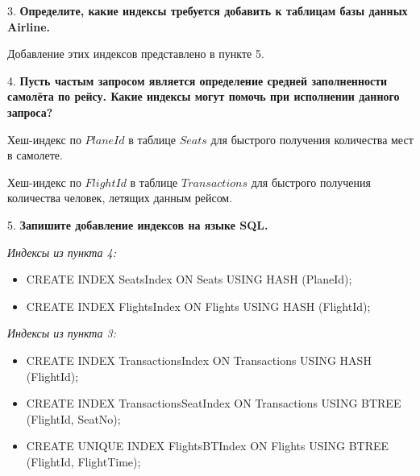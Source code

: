 \documentclass[11pt,a4paper,oneside]{article}
\begin{document}
3. \textbf{Определите, какие индексы требуется добавить к таблицам базы данных Airline.}

  Добавление этих индексов представлено в пункте 5.

4. \textbf{Пусть частым запросом является определение средней заполненности самолёта по рейсу. Какие индексы могут помочь при исполнении данного запроса?}

  Хеш-индекс по $PlaneId$ в таблице $Seats$ для быстрого получения количества мест в самолете.

  Хеш-индекс по $FlightId$ в таблице $Transactions$ для быстрого получения количества человек, летящих данным рейсом.

5. \textbf{Запишите добавление индексов на языке SQL.}

  \textit{Индексы из пункта 4:}
  \begin{itemize}
    \item CREATE INDEX SeatsIndex ON Seats USING HASH (PlaneId);
    \item CREATE INDEX FlightsIndex ON Flights USING HASH (FlightId);
  \end{itemize}

  \textit{Индексы из пункта 3:}
  \begin{itemize}
    \item CREATE INDEX TransactionsIndex ON Transactions USING HASH (FlightId);
    \item CREATE INDEX TransactionsSeatIndex ON Transactions USING BTREE (FlightId, SeatNo);
    \item CREATE UNIQUE INDEX FlightsBTIndex ON Flights USING BTREE (FlightId, FlightTime);
  \end{itemize}  
\end{document}
